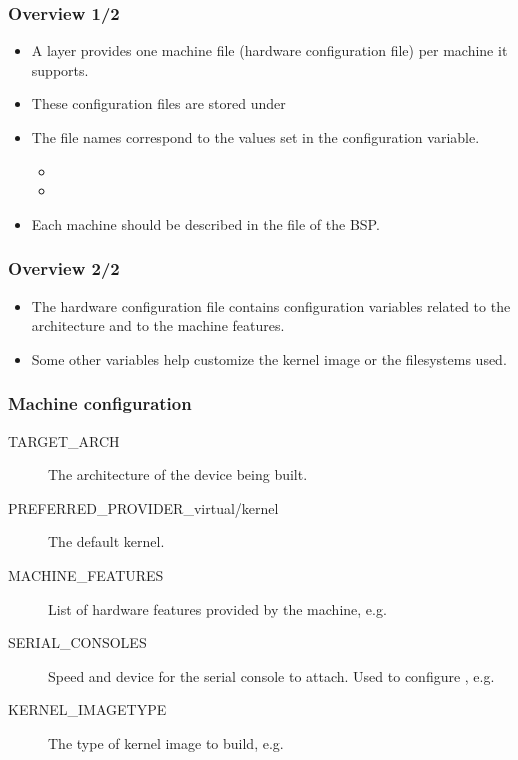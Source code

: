\begin{frame}
  \frametitle{Overview 1/2}
  \begin{itemize}
    \item A layer provides one machine file (hardware configuration
      file) per machine it supports.
    \item These configuration files are stored under
    \item The file names correspond to the values set in the
       configuration variable.
      \begin{itemize}
        \item {}
        \item {}
      \end{itemize}
    \item Each machine should be described in the  file
      of the BSP.
  \end{itemize}
\end{frame}

\begin{frame}
  \frametitle{Overview 2/2}
  \begin{itemize}
    \item The hardware configuration file contains configuration
      variables related to the architecture and to the machine
      features.
    \item Some other variables help customize the kernel image or the
      filesystems used.
  \end{itemize}
\end{frame}

\begin{frame}
  \frametitle{Machine configuration}
  \begin{description}
    \item[TARGET\_ARCH] The architecture of the device being built.
    \item[PREFERRED\_PROVIDER\_virtual/kernel] The default kernel.
    \item[MACHINE\_FEATURES] List of hardware features provided by the
      machine, e.g. 
    \item[SERIAL\_CONSOLES] Speed and device for the serial console to
	    attach. Used to configure ,
      e.g. 
    \item[KERNEL\_IMAGETYPE] The type of kernel image to build, e.g.
  \end{description}
\end{frame}

